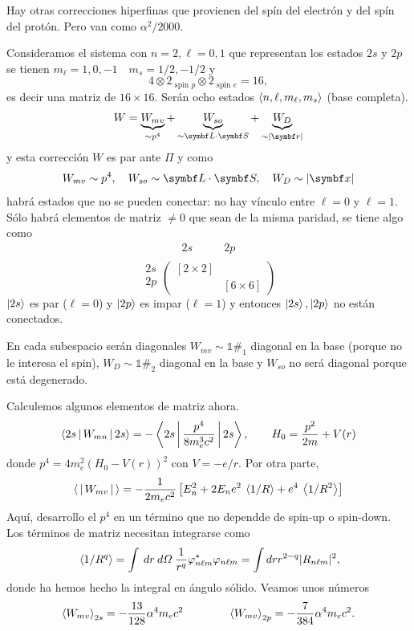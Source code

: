 \documentclass[10pt,oneside]{CBFT_book}
\begin{document}
Hay otras correcciones hiperfinas que provienen del spín del electrón y del spín del protón. Pero van como 
$\alpha^2/2000$.

Consideramos el sistema con $ n = 2, \ell=0, 1 $ que representan los estados $2s$ y $2p$ se tienen 
$ m_\ell = 1,0,-1 \quad m_s=1/2,-1/2 $ y
\[
	4 \otimes 2_{\text{ spin }p } \otimes 2_{\text{ spin }e } = 16,
\]
es decir una matriz de $16 \times 16$.
Serán ocho estados $\Braket{n,\ell,m_\ell,m_s}$ (base completa).
\[
	W = \underbrace{W_{mv}}_{\sim p^4} + \underbrace{W_{so}}_{\sim \vb{L}\cdot\vb{S}} + 
	\underbrace{W_D}_{\sim |\vb{r}|}
\]
y esta corrección $W$ es par ante $\Pi$ y como
\[
	W_{mv} \sim p^4, \quad W_{so} \sim \pe{L}{S}, \quad W_D \sim |\vb x|
\]
habrá estados que no se pueden conectar: no hay vínculo entre $\ell=0$ y $\ell=1$.
Sólo habrá elementos de matriz $\neq 0$ que sean de la misma paridad, se tiene algo como
\[
	\begin{matrix}
	2s & \qquad 2p \\	 
	\end{matrix}
\]
\[
\begin{matrix}
 2s\\
 2p\\
\end{matrix}
	\begin{pmatrix}
	[2\times 2] & \\
	& [ 6\times 6 ] 
	\end{pmatrix}
\]
$\Ket{2s}$ es par ($\ell=0$) y $\Ket{2p}$ es impar ($\ell=1$) y entonces $\Ket{2s}, \Ket{2p}$
no están conectados.

En cada subespacio serán diagonales $W_{mv} \sim \mathbb{1} \#_1 $ diagonal en la base (porque no 
le interesa el spin), $ W_D \sim \mathbb{1} \#_2 $ diagonal en la base y $W_{so}$ no será diagonal
porque está degenerado.

Calculemos algunos elementos de matriz ahora.
\[
	\Braket{2s |W_{mn}| 2s} = - \Braket{2s | \frac{p^4}{8 m^3_e c^2 } | 2s}, \qquad 
	H_0 = \frac{p^2}{2 m } + V(r)
\]
donde $p^4 =  4 m_e^2 ( H_0 - V(r) )^2 $ con $ V = - e/r $.
Por otra parte,
\[
	\Braket{|W_{mv}|} = - \frac{1}{2 m_e c^2}
	\left[ E_n^2 + 2 E_n e^2 \:\left\langle 1/R \right\rangle + e^4 \:\left\langle 1/R^2 \right\rangle \right]
\]
Aquí, desarrollo el $p^4$ en un término que no dependde de spin-up o spin-down.
Los términos de matriz necesitan integrarse como
\[
	\:\left\langle 1/R^q \right\rangle = \int \: dr \: d\Omega \: \frac{1}{r^q} \varphi_{n\ell m}^*\varphi_{n\ell m} =
	\int dr r^{2-q} |R_{n\ell m}|^2,
\]
donde ha hemos hecho la integral en ángulo sólido. Veamos unos números
\[
	\Braket{W_{mv}}_{2s} = -\frac{13}{128} \alpha^4 m_e c^2 
	\qquad \qquad 
	\Braket{W_{mv}}_{2p} = -\frac{7}{384} \alpha^4 m_e c^2 .
\]
\end{document}
